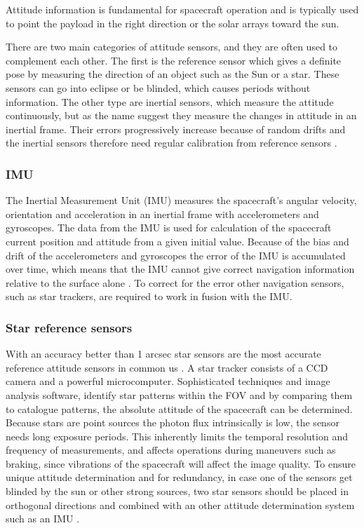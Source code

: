 Attitude information is fundamental for spacecraft operation and is typically used to point the payload in the right direction or the solar arrays toward the sun. 

There are two main categories of attitude sensors, and they are often used to complement each
other. The first is the reference sensor which gives a definite pose by measuring the direction of an object
such as the Sun or a star. These sensors can go into eclipse or be blinded, which causes periods without information. The other type are inertial sensors, which measure the attitude continuously, but as the name suggest they measure the changes in attitude in an inertial frame. Their errors progressively increase because of random drifts and the inertial sensors therefore need regular calibration from reference sensors \cite{spacecraft}.

\subsubsection{IMU}
The Inertial Measurement Unit (IMU) measures the spacecraft's angular velocity, orientation and acceleration in an inertial frame with accelerometers and gyroscopes. The data from the IMU is used for calculation of the spacecraft current position and attitude from a given initial value. Because of the bias and drift of the accelerometers and gyroscopes the error of the IMU is accumulated over time, which means that the IMU cannot give correct navigation information relative to the surface alone \cite{IMUcamb}.
To correct for the error other navigation sensors, such as star trackers, are required to work in fusion with the IMU. 



\subsubsection{Star reference sensors}
With an accuracy better than 1 arcsec star sensors are the most accurate reference attitude sensors in common us \cite{spacecraft}. A star tracker consists of a CCD camera and a powerful microcomputer. Sophisticated techniques and image analysis software, identify star patterns within the FOV and by comparing them to catalogue patterns, the absolute attitude of the spacecraft can be determined.  Because stars are point sources the photon flux intrinsically is low, the sensor needs long exposure periods. This inherently limits the temporal resolution and frequency of measurements, and affects operations during maneuvers such as braking, since vibrations of the spacecraft will affect the image quality. To ensure unique attitude determination and for redundancy, in case one of the sensors get blinded by the sun or other strong sources, two star sensors should be placed in orthogonal directions and combined with an other attitude determination system such as an IMU \cite{alessandro}.

